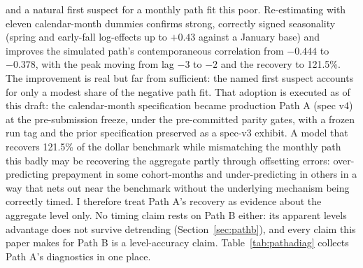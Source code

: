 \documentclass[12pt]{article}
\begin{document}
and a natural first suspect for a monthly path fit this poor. Re-estimating with eleven calendar-month dummies confirms strong, correctly signed seasonality (spring and early-fall log-effects up to $+0.43$ against a January base) and improves the simulated path's contemporaneous correlation from $-0.444$ to $-0.378$, with the peak moving from lag $-3$ to $-2$ and the recovery to 121.5\%. The improvement is real but far from sufficient: the named first suspect accounts for only a modest share of the negative path fit. That adoption is executed as of this draft: the calendar-month specification became production Path A (spec v4) at the pre-submission freeze, under the pre-committed parity gates, with a frozen run tag and the prior specification preserved as a spec-v3 exhibit. A model that recovers 121.5\% of the dollar benchmark while mismatching the monthly path this badly may be recovering the aggregate partly through offsetting errors: over-predicting prepayment in some cohort-months and under-predicting in others in a way that nets out near the benchmark without the underlying mechanism being correctly timed. I therefore treat Path A's recovery as evidence about the aggregate level only. No timing claim rests on Path B either: its apparent levels advantage does not survive detrending (Section~\ref{sec:pathb}), and every claim this paper makes for Path B is a level-accuracy claim. Table~\ref{tab:pathadiag} collects Path A's diagnostics in one place.
\end{document}
